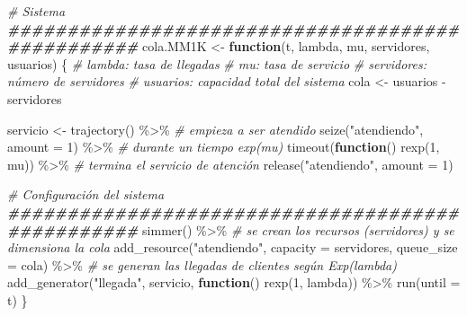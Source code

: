 \documentclass[
]{book}
\newenvironment{Shaded}{\begin{snugshade}}{\end{snugshade}}
\newcommand{\AttributeTok}[1]{\textcolor[rgb]{0.77,0.63,0.00}{#1}}
\newcommand{\CommentTok}[1]{\textcolor[rgb]{0.56,0.35,0.01}{\textit{#1}}}
\newcommand{\ControlFlowTok}[1]{\textcolor[rgb]{0.13,0.29,0.53}{\textbf{#1}}}
\newcommand{\DecValTok}[1]{\textcolor[rgb]{0.00,0.00,0.81}{#1}}
\newcommand{\DocumentationTok}[1]{\textcolor[rgb]{0.56,0.35,0.01}{\textbf{\textit{#1}}}}
\newcommand{\FunctionTok}[1]{\textcolor[rgb]{0.00,0.00,0.00}{#1}}
\newcommand{\NormalTok}[1]{#1}
\newcommand{\OtherTok}[1]{\textcolor[rgb]{0.56,0.35,0.01}{#1}}
\newcommand{\SpecialCharTok}[1]{\textcolor[rgb]{0.00,0.00,0.00}{#1}}
\newcommand{\StringTok}[1]{\textcolor[rgb]{0.31,0.60,0.02}{#1}}
\theoremstyle{definition}
\theoremstyle{definition}
\theoremstyle{definition}
\theoremstyle{definition}
\theoremstyle{remark}
\begin{document}
\begin{Shaded}
\begin{Highlighting}[]
\CommentTok{\# Sistema}
\DocumentationTok{\#\#\#\#\#\#\#\#\#\#\#\#\#\#\#\#\#\#\#\#\#\#\#\#\#\#\#\#\#\#\#\#\#\#\#\#\#\#\#\#\#\#\#\#\#\#\#\#\#}
\NormalTok{cola.MM1K }\OtherTok{\textless{}{-}} \ControlFlowTok{function}\NormalTok{(t, lambda, mu, servidores, usuarios)}
\NormalTok{\{}
  \CommentTok{\# lambda: tasa de llegadas}
  \CommentTok{\# mu: tasa de servicio}
  \CommentTok{\# servidores: número de servidores}
  \CommentTok{\# usuarios: capacidad total del sistema}
\NormalTok{  cola }\OtherTok{\textless{}{-}}\NormalTok{ usuarios }\SpecialCharTok{{-}}\NormalTok{ servidores}
  
\NormalTok{  servicio }\OtherTok{\textless{}{-}} \FunctionTok{trajectory}\NormalTok{() }\SpecialCharTok{\%\textgreater{}\%}
    \CommentTok{\# empieza a ser atendido}
    \FunctionTok{seize}\NormalTok{(}\StringTok{"atendiendo"}\NormalTok{, }\AttributeTok{amount =} \DecValTok{1}\NormalTok{) }\SpecialCharTok{\%\textgreater{}\%}   
    \CommentTok{\# durante un tiempo exp(mu)}
    \FunctionTok{timeout}\NormalTok{(}\ControlFlowTok{function}\NormalTok{() }\FunctionTok{rexp}\NormalTok{(}\DecValTok{1}\NormalTok{, mu)) }\SpecialCharTok{\%\textgreater{}\%} 
    \CommentTok{\# termina el servicio de atención}
    \FunctionTok{release}\NormalTok{(}\StringTok{"atendiendo"}\NormalTok{, }\AttributeTok{amount =} \DecValTok{1}\NormalTok{)               }

  \CommentTok{\# Configuración del sistema }
  \DocumentationTok{\#\#\#\#\#\#\#\#\#\#\#\#\#\#\#\#\#\#\#\#\#\#\#\#\#\#\#\#\#\#\#\#\#\#\#\#\#\#\#\#\#\#\#\#\#\#\#\#\#}
  \FunctionTok{simmer}\NormalTok{() }\SpecialCharTok{\%\textgreater{}\%}
    \CommentTok{\# se crean los recursos (servidores) y se dimensiona la cola}
    \FunctionTok{add\_resource}\NormalTok{(}\StringTok{"atendiendo"}\NormalTok{, }\AttributeTok{capacity =}\NormalTok{ servidores, }\AttributeTok{queue\_size =}\NormalTok{ cola) }\SpecialCharTok{\%\textgreater{}\%}    
    \CommentTok{\# se generan las llegadas de clientes según Exp(lambda)}
    \FunctionTok{add\_generator}\NormalTok{(}\StringTok{"llegada"}\NormalTok{, servicio, }\ControlFlowTok{function}\NormalTok{() }\FunctionTok{rexp}\NormalTok{(}\DecValTok{1}\NormalTok{, lambda)) }\SpecialCharTok{\%\textgreater{}\%} 
    \FunctionTok{run}\NormalTok{(}\AttributeTok{until =}\NormalTok{ t)     }
\NormalTok{\}}
\end{Highlighting}
\end{Shaded}
\end{document}
